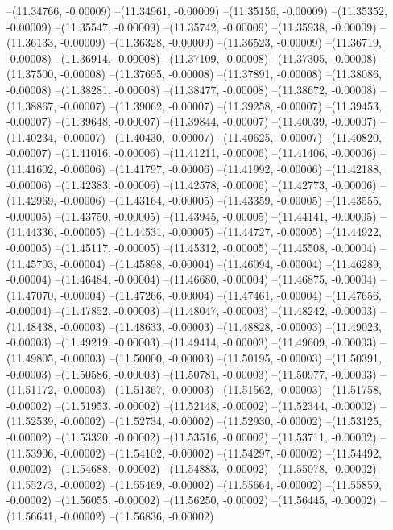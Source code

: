 --(11.34766, -0.00009)
--(11.34961, -0.00009)
--(11.35156, -0.00009)
--(11.35352, -0.00009)
--(11.35547, -0.00009)
--(11.35742, -0.00009)
--(11.35938, -0.00009)
--(11.36133, -0.00009)
--(11.36328, -0.00009)
--(11.36523, -0.00009)
--(11.36719, -0.00008)
--(11.36914, -0.00008)
--(11.37109, -0.00008)
--(11.37305, -0.00008)
--(11.37500, -0.00008)
--(11.37695, -0.00008)
--(11.37891, -0.00008)
--(11.38086, -0.00008)
--(11.38281, -0.00008)
--(11.38477, -0.00008)
--(11.38672, -0.00008)
--(11.38867, -0.00007)
--(11.39062, -0.00007)
--(11.39258, -0.00007)
--(11.39453, -0.00007)
--(11.39648, -0.00007)
--(11.39844, -0.00007)
--(11.40039, -0.00007)
--(11.40234, -0.00007)
--(11.40430, -0.00007)
--(11.40625, -0.00007)
--(11.40820, -0.00007)
--(11.41016, -0.00006)
--(11.41211, -0.00006)
--(11.41406, -0.00006)
--(11.41602, -0.00006)
--(11.41797, -0.00006)
--(11.41992, -0.00006)
--(11.42188, -0.00006)
--(11.42383, -0.00006)
--(11.42578, -0.00006)
--(11.42773, -0.00006)
--(11.42969, -0.00006)
--(11.43164, -0.00005)
--(11.43359, -0.00005)
--(11.43555, -0.00005)
--(11.43750, -0.00005)
--(11.43945, -0.00005)
--(11.44141, -0.00005)
--(11.44336, -0.00005)
--(11.44531, -0.00005)
--(11.44727, -0.00005)
--(11.44922, -0.00005)
--(11.45117, -0.00005)
--(11.45312, -0.00005)
--(11.45508, -0.00004)
--(11.45703, -0.00004)
--(11.45898, -0.00004)
--(11.46094, -0.00004)
--(11.46289, -0.00004)
--(11.46484, -0.00004)
--(11.46680, -0.00004)
--(11.46875, -0.00004)
--(11.47070, -0.00004)
--(11.47266, -0.00004)
--(11.47461, -0.00004)
--(11.47656, -0.00004)
--(11.47852, -0.00003)
--(11.48047, -0.00003)
--(11.48242, -0.00003)
--(11.48438, -0.00003)
--(11.48633, -0.00003)
--(11.48828, -0.00003)
--(11.49023, -0.00003)
--(11.49219, -0.00003)
--(11.49414, -0.00003)
--(11.49609, -0.00003)
--(11.49805, -0.00003)
--(11.50000, -0.00003)
--(11.50195, -0.00003)
--(11.50391, -0.00003)
--(11.50586, -0.00003)
--(11.50781, -0.00003)
--(11.50977, -0.00003)
--(11.51172, -0.00003)
--(11.51367, -0.00003)
--(11.51562, -0.00003)
--(11.51758, -0.00002)
--(11.51953, -0.00002)
--(11.52148, -0.00002)
--(11.52344, -0.00002)
--(11.52539, -0.00002)
--(11.52734, -0.00002)
--(11.52930, -0.00002)
--(11.53125, -0.00002)
--(11.53320, -0.00002)
--(11.53516, -0.00002)
--(11.53711, -0.00002)
--(11.53906, -0.00002)
--(11.54102, -0.00002)
--(11.54297, -0.00002)
--(11.54492, -0.00002)
--(11.54688, -0.00002)
--(11.54883, -0.00002)
--(11.55078, -0.00002)
--(11.55273, -0.00002)
--(11.55469, -0.00002)
--(11.55664, -0.00002)
--(11.55859, -0.00002)
--(11.56055, -0.00002)
--(11.56250, -0.00002)
--(11.56445, -0.00002)
--(11.56641, -0.00002)
--(11.56836, -0.00002)
